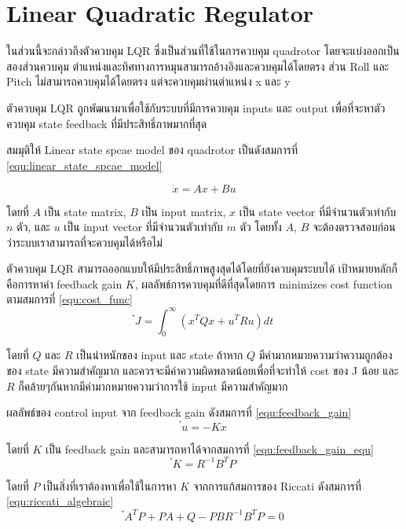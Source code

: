 \clearpage
\section{Linear Quadratic Regulator}
ในส่วนนี้จะกล่าวถึงตัวควบคุม LQR ซึ่งเป็นส่วนที่ใช้ในการควบคุม quadrotor โดยจะแบ่งออกเป็นสองส่วนควบคุม
ตำแหน่งและทิศทางการหมุนสามารถอ้างอิงและควบคุมได้โดยตรง ส่วน Roll และ Pitch ไม่สามารถควบคุมได้โดยตรง
แต่จะควบคุมผ่านตำแหน่ง x และ y

ตัวควบคุม LQR ถูกพัฒนามาเพื่อใช้กับระบบที่มีการควบคุม inputs และ output เพื่อที่จะหาตัวควบคุม state feedback
ที่มีประสิทธิ์ภาพมากที่สุด

สมมุติให้ Linear state spcae model ของ quadrotor เป็นดังสมการที่ \ref{equ:linear_state_spcae_model}

\begin{equation}
    {\dot{x} = Ax + Bu}
	\label{equ:linear_state_spcae_model}
\end{equation}

โดยที่ $A$ เป็น state matrix, $B$ เป็น input matrix, $x$ เป็น state vector ที่มีจำนวนตัวเท่ากับ $n$ ตัว,
และ $u$ เป็น input vector ที่มีจำนวนตัวเท่ากับ $m$ ตัว โดยทั้ง $A$, $B$ จะต้องตรวจสอบก่อนว่าระบบเราสามารถที่จะควบคุมได้หรือไม่

ตัวควบคุม LQR สามารถออกแบบให้มีประสิทธิ์ภาพสูงสุดได้โดยที่ยังควบคุมระบบได้ เป้าหมายหลักก็คือการหาค่า feedback gain $K$,
ผลลัพธ์การควบคุมที่ดีที่สุดโดยการ minimizes cost function ตามสมการที่ \ref{equ:cost_func}
\begin{equation}
    {๋J = \int_{0}^{\infty} (x^TQx+u^TRu) dt}
	\label{equ:cost_func}
\end{equation}

โดยที่ $Q$ และ $R$ เป็นนำหนักของ input และ state ถ้าหาก $Q$ มีค่ามากหมายความว่าความถูกต้องของ state มีความสำคัญมาก
และควรจะมีค่าความผิดพลาดน้อยเพื่อที่จะทำให้ cost ของ J น้อย และ $R$ ก็คล้ายๆกันหากมีค่ามากหมายความว่าการใช้ input มีความสำคัญมาก

ผลลัพธ์ของ control input จาก feedback gain ดังสมการที่ \ref{equ:feedback_gain}
\begin{equation}
    {๋u = -Kx}
	\label{equ:feedback_gain}
\end{equation}

โดยที่ $K$ เป็น feedback gain และสามารถหาได้จากสมการที่ \ref{equ:feedback_gain_equ}
\begin{equation}
    {๋K = R^{-1}B^TP}
	\label{equ:feedback_gain_equ}
\end{equation}

โดยที่ $P$ เป็นสิ่งที่เราต้องหาเพื่อใช้ในการหา $K$ จากการแก้สมการของ Riccati ดังสมการที่ \ref{equ:riccati_algebraic}
\begin{equation}
    {๋A^TP+PA+Q-PBR^{-1}B^TP = 0}
	\label{equ:riccati_algebraic}
\end{equation}

